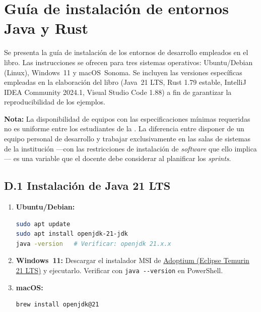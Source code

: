 \chapter{Guía de instalación de entornos Java y Rust}
\label{apx:instalacion}

\noindent
Se presenta la guía de instalación de los entornos de desarrollo
empleados en el libro. Las instrucciones se ofrecen para tres sistemas
operativos: Ubuntu/Debian (Linux), Windows~11 y macOS~Sonoma.
Se incluyen las versiones específicas empleadas en la elaboración
del libro (Java~21 LTS, Rust 1.79 estable, IntelliJ IDEA Community
2024.1, Visual Studio Code 1.88) a fin de garantizar la reproducibilidad
de los ejemplos.

\medskip\noindent
\textbf{Nota:} La disponibilidad de equipos con las especificaciones
mínimas requeridas no es uniforme entre los estudiantes de la \ud.
La diferencia entre disponer de un equipo personal de desarrollo y
trabajar exclusivamente en las salas de sistemas de la institución ---con
las restricciones de instalación de \textit{software} que ello implica---
es una variable que el docente debe considerar al planificar los
\textit{sprints}.

\section*{D.1 Instalación de Java 21 LTS}

\begin{enumerate}[label=\textbf{D.1.\arabic*.}]
  \item \textbf{Ubuntu/Debian:}
    \begin{lstlisting}[style=baseStyle, language=bash,
      numbers=none, frame=none, backgroundcolor=\color{white},
      basicstyle=\ttfamily\small]
sudo apt update
sudo apt install openjdk-21-jdk
java -version   # Verificar: openjdk 21.x.x
    \end{lstlisting}
  \item \textbf{Windows~11:} Descargar el instalador MSI de
    \href{https://adoptium.net}{Adoptium (Eclipse Temurin 21 LTS)}
    y ejecutarlo. Verificar con \texttt{java -{}-version} en PowerShell.
  \item \textbf{macOS:}
    \begin{lstlisting}[style=baseStyle, language=bash,
      numbers=none, frame=none, backgroundcolor=\color{white},
      basicstyle=\ttfamily\small]
brew install openjdk@21
    \end{lstlisting}
\end{enumerate}

